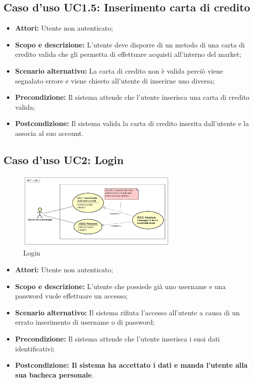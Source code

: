 \documentclass[12pt,a4paper,titlepage]{article}
\begin{document}
\subsection{Caso d'uso UC1.5: Inserimento carta di credito}
\begin{itemize}
	\item \textbf{Attori: }Utente non autenticato;
	\item \textbf{Scopo e descrizione: }L'utente deve disporre di un metodo di una carta di credito valida che gli permetta di effettuare acquisti all'interno del market;
	\item \textbf{Scenario alternativo: }La carta di credito non è valida perciò viene segnalato errore e viene chiesto all'utente di inserirne uno diversa;
	\item \textbf{Precondizione: }Il sistema attende che l'utente inserisca una carta di credito valida;
	\item \textbf{Postcondizione: }Il sistema valida la carta di credito inserita dall'utente e la associa al suo account.
\end{itemize}
\subsection{Caso d'uso UC2: Login}
\begin{figure}[H]
	\centering
	\includegraphics[width=0.7\textwidth]{UseCase/Login}
	\caption{Login}
\end{figure}
\begin{itemize}
	\item \textbf{Attori:} Utente non autenticato;
	\item \textbf{Scopo e descrizione:} L'utente che possiede già uno username e una password vuole effettuare un accesso;
	\item \textbf{Scenario alternativo: }Il sistema rifiuta l'accesso all'utente a causa di un errato inserimento di username o di password;
	\item \textbf{Precondizione: }Il sistema attende che l'utente inserisca i suoi dati identificativi;
	\item \textbf{Postcondizione: Il sistema ha accettato i dati e manda l'utente alla sua bacheca personale}.
\end{itemize}
\end{document}
